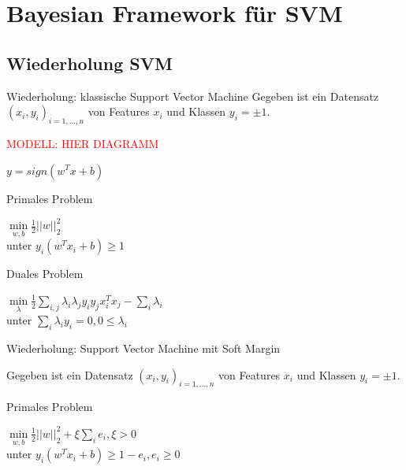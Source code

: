 \documentclass{beamer}
\begin{document}
{\section{Bayesian Framework für SVM}

\frame{\tableofcontents[currentsection,subsectionstyle=show/shaded,hideothersubsections]}

\subsection{Wiederholung SVM}

\begin{frame}{Wiederholung: klassische Support Vector Machine}
Gegeben ist ein Datensatz $(x_i,y_i)_{i=1,...,n}$ von Features $x_i$ und Klassen $y_i = \pm 1$.

\textcolor{red}{MODELL: HIER DIAGRAMM}

$y = sign(w^T x + b)$


\begin{block}{Primales Problem}
	\begin{center}
	$ \underset{w, b}{\min} \frac{1}{2}\vert \vert w \vert \vert ^2_2$\\
	unter $ y_i(w^T x_i + b) \geq 1$
	\end{center}
\end{block}


\begin{block}{Duales Problem}
	\begin{center}
	$\underset{\lambda}{\min} \frac{1}{2}\underset{i,j}{\sum} \lambda_i \lambda_j y_i y_j x_i^T x_j - \underset{i}{\sum}\lambda_i$ \\
	unter $\underset{i}{\sum}\lambda_i y_i = 0, 0 \leq \lambda_i $
	\end{center}
\end{block}

\end{frame}

\begin{frame}{Wiederholung: Support Vector Machine mit Soft Margin}

Gegeben ist ein Datensatz $(x_i,y_i)_{i=1,...,n}$ von Features $x_i$ und Klassen $y_i = \pm 1$.


\begin{block}{Primales Problem}
	\begin{center}
	$ \underset{w, b}{\min} \frac{1}{2}\vert \vert w \vert \vert ^2_2 + \xi \underset{i}{\sum}e_i, \xi > 0$\\
	unter $ y_i(w^T x_i + b) \geq 1 - e_i, e_i \geq 0$
	\end{center}
\end{block}



\end{frame}}
\end{document}
